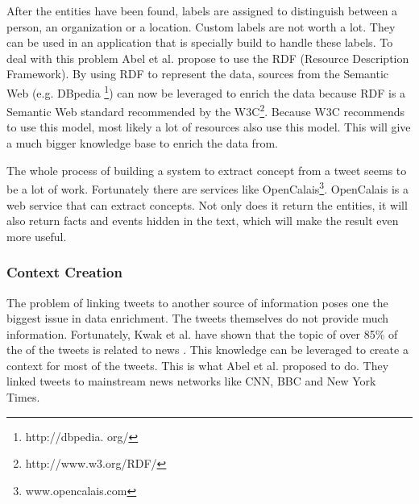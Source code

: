 \documentclass{article}
\begin{document}
After the entities have been found, labels are assigned to distinguish between a person, an organization or a location. Custom labels are not worth a lot. They can be used in an application that is specially build to handle these labels. To deal with this problem Abel et al. propose to use the RDF (Resource Description Framework).\cite{AdaptiveSearch} By using RDF to represent the data, sources from the Semantic Web (e.g. DBpedia \footnote{http://dbpedia.
org/}) can now be leveraged to enrich the data because RDF is a Semantic Web standard recommended by the W3C\footnote{http://www.w3.org/RDF/}. Because W3C recommends to use this model, most likely a lot of resources also use this model. This will give a much bigger knowledge base to enrich the data from.

The whole process of building a system to extract concept from a tweet seems to be a lot of work. Fortunately there are services like OpenCalais\footnote{www.opencalais.com}. OpenCalais is a web service that can extract concepts. Not only does it return the entities, it will also return facts and events hidden in the text, which will make the result even more useful.
\subsubsection*{Context Creation}
The problem of linking tweets to another source of information poses one the biggest issue in data enrichment. The tweets themselves do not provide much information. Fortunately, Kwak et al. have shown that the topic of over 85\% of the of the tweets is related to news \cite{newsmedia}. This knowledge can be leveraged to create a context for most of the tweets.  This is what Abel et al. proposed to do\cite{enrichmentForProfiling}. They linked tweets to mainstream news networks like CNN, BBC and New York Times.
\end{document}
